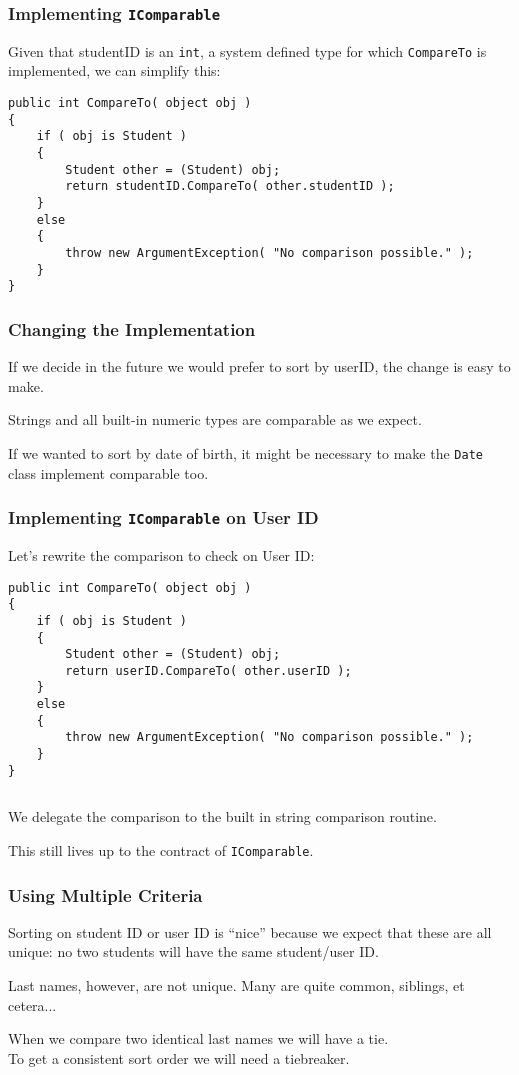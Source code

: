 \begin{frame}[fragile]
\frametitle{Implementing \texttt{IComparable}}

Given that studentID is an \texttt{int}, a system defined type for which \texttt{CompareTo} is implemented, we can simplify this:

{\scriptsize
\begin{verbatim}
public int CompareTo( object obj )
{
    if ( obj is Student )
    {
        Student other = (Student) obj;
        return studentID.CompareTo( other.studentID );
    }
    else
    {
        throw new ArgumentException( "No comparison possible." ); 
    }
}
\end{verbatim}
}
\end{frame}

\begin{frame}
\frametitle{Changing the Implementation}
If we decide in the future we would prefer to sort by userID, the change is easy to make.

Strings and all built-in numeric types are comparable as we expect.

If we wanted to sort by date of birth, it might be necessary to make the \texttt{Date} class implement comparable too.

\end{frame}

\begin{frame}[fragile]
\frametitle{Implementing \texttt{IComparable} on User ID}

Let's rewrite the comparison to check on User ID:

{\scriptsize
\begin{verbatim}
public int CompareTo( object obj )
{
    if ( obj is Student )
    {
        Student other = (Student) obj;
        return userID.CompareTo( other.userID );
    }
    else
    {
        throw new ArgumentException( "No comparison possible." ); 
    }
}
\end{verbatim}
}

\begin{verbatim}

\end{verbatim}

We delegate the comparison to the built in string comparison routine.

This still lives up to the contract of \texttt{IComparable}.

\end{frame}

\begin{frame}
\frametitle{Using Multiple Criteria}
Sorting on student ID or user ID is ``nice'' because we expect that these are all unique: no two students will have the same student/user ID.

Last names, however, are not unique. Many are quite common, siblings, et cetera...

When we compare two identical last names we will have a tie.\\
\quad To get a consistent sort order we will need a tiebreaker.

\end{frame}


